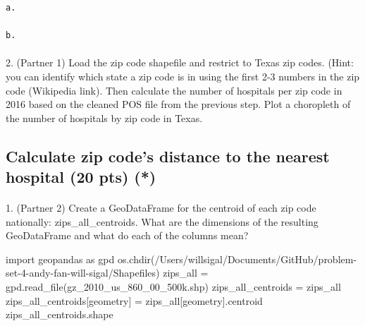 \documentclass[
  letterpaper,
  DIV=11,
  numbers=noendperiod]{scrartcl}
\makeatletter
\let\oldparagraph\paragraph
\renewcommand{\paragraph}{
    \@ifstar
      \xxxParagraphStar
      \xxxParagraphNoStar
  }
\newcommand{\xxxParagraphStar}[1]{\oldparagraph*{#1}\mbox{}}
\newcommand{\xxxParagraphNoStar}[1]{\oldparagraph{#1}\mbox{}}
\newenvironment{Shaded}{\begin{snugshade}}{\end{snugshade}}
\newcommand{\ImportTok}[1]{\textcolor[rgb]{0.00,0.46,0.62}{#1}}
\newcommand{\NormalTok}[1]{\textcolor[rgb]{0.00,0.23,0.31}{#1}}
\newcommand{\OperatorTok}[1]{\textcolor[rgb]{0.37,0.37,0.37}{#1}}
\newcommand{\StringTok}[1]{\textcolor[rgb]{0.13,0.47,0.30}{#1}}
\makeatother
\begin{document}
\begin{verbatim}
a.

b. 
\end{verbatim}

\paragraph{2. (Partner 1) Load the zip code shapefile and restrict to
Texas zip codes. (Hint: you can identify which state a zip code is in
using the first 2-3 numbers in the zip code (Wikipedia link). Then
calculate the number of hospitals per zip code in 2016 based on the
cleaned POS file from the previous step. Plot a choropleth of the number
of hospitals by zip code in
Texas.}\label{partner-1-load-the-zip-code-shapefile-and-restrict-to-texas-zip-codes.-hint-you-can-identify-which-state-a-zip-code-is-in-using-the-first-2-3-numbers-in-the-zip-code-wikipedia-link.-then-calculate-the-number-of-hospitals-per-zip-code-in-2016-based-on-the-cleaned-pos-file-from-the-previous-step.-plot-a-choropleth-of-the-number-of-hospitals-by-zip-code-in-texas.}

\subsection{Calculate zip code's distance to the nearest hospital (20
pts)
(*)}\label{calculate-zip-codes-distance-to-the-nearest-hospital-20-pts}

\paragraph{1. (Partner 2) Create a GeoDataFrame for the centroid of each
zip code nationally: zips\_all\_centroids. What are the dimensions of
the resulting GeoDataFrame and what do each of the columns
mean?}\label{partner-2-create-a-geodataframe-for-the-centroid-of-each-zip-code-nationally-zips_all_centroids.-what-are-the-dimensions-of-the-resulting-geodataframe-and-what-do-each-of-the-columns-mean}

\begin{Shaded}
\begin{Highlighting}[]
\ImportTok{import}\NormalTok{ geopandas }\ImportTok{as}\NormalTok{ gpd}
\NormalTok{os.chdir(}\StringTok{\textquotesingle{}/Users/willsigal/Documents/GitHub/problem{-}set{-}4{-}andy{-}fan{-}will{-}sigal/Shapefiles\textquotesingle{}}\NormalTok{)}
\NormalTok{zips\_all }\OperatorTok{=}\NormalTok{ gpd.read\_file(}\StringTok{\textquotesingle{}gz\_2010\_us\_860\_00\_500k.shp\textquotesingle{}}\NormalTok{)}
\NormalTok{zips\_all\_centroids }\OperatorTok{=}\NormalTok{ zips\_all}
\NormalTok{zips\_all\_centroids[}\StringTok{\textquotesingle{}geometry\textquotesingle{}}\NormalTok{] }\OperatorTok{=}\NormalTok{ zips\_all[}\StringTok{\textquotesingle{}geometry\textquotesingle{}}\NormalTok{].centroid}
\NormalTok{zips\_all\_centroids.shape}
\end{Highlighting}
\end{Shaded}
\end{document}
